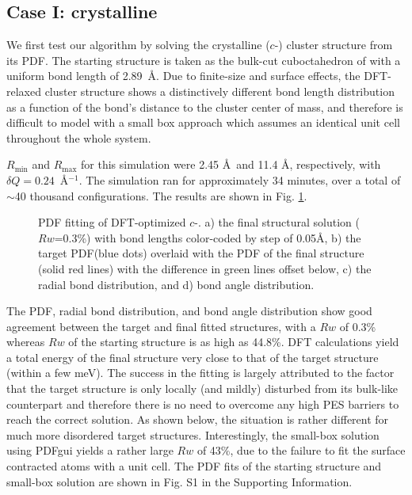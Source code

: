 \subsection{Case I: crystalline }
We first test our algorithm by solving the crystalline  ($c$-) cluster structure from its PDF.
The starting structure is taken as the bulk-cut cuboctahedron of   with a uniform bond length of 2.89~\AA.
Due to finite-size and surface effects, the DFT-relaxed cluster structure shows a distinctively different bond length distribution as a function of the bond's distance to the cluster center of mass, and therefore is difficult to model with a small box approach which assumes an identical unit cell throughout the whole system.

 $R_\mathrm{min}$ and $R_\mathrm{max}$ for this simulation were 2.45 \AA ~and 11.4 \AA, respectively, with $\delta Q=0.24$~\AA$^{-1}$. The simulation ran for approximately 34 minutes, over a total of $\sim$40 thousand configurations.  The results are shown in Fig. \ref{fig:Au55 bulk -> DFT, metrics}.
\begin{figure}
  \def \localimgpath {./Au_55_DFT_HMC_paper_final/55d7ccded2d355710ddb3fdf}
  \centering
  \captionsetup[subfigure]{labelformat=simple}
    \quad
    \quad
    \quad
    \quad

   \caption{ PDF fitting of DFT-optimized $c$-. a) the final structural solution ($Rw$=0.3\%) with  bond lengths color-coded by step of 0.05\AA, b) the target PDF(blue dots) overlaid with the PDF of the final structure (solid red lines) with the difference in green lines offset below, c) the radial bond distribution, and d) bond angle distribution.  }
         \label{fig:Au55 bulk -> DFT, metrics}
\end{figure}

The PDF, radial bond distribution, and bond angle distribution show good agreement between the target and final fitted structures, with a $Rw$ of 0.3\% whereas $Rw$ of the starting structure is as high as 44.8\%. DFT calculations yield a total energy of the final structure very close to that of the target structure (within a few meV). The success in the fitting is largely attributed to the factor that the target structure is only locally (and mildly) disturbed from its bulk-like counterpart and therefore there is no need to overcome any high PES barriers to reach the correct solution. As shown below, the situation is rather different for much more disordered target structures. Interestingly, the small-box solution using PDFgui\cite{Farrow2007} yields a rather large $Rw$ of 43\%, due to the failure to fit the surface contracted atoms with a unit cell. The PDF fits of the starting structure and small-box solution are shown in Fig. S1 in the Supporting Information.

